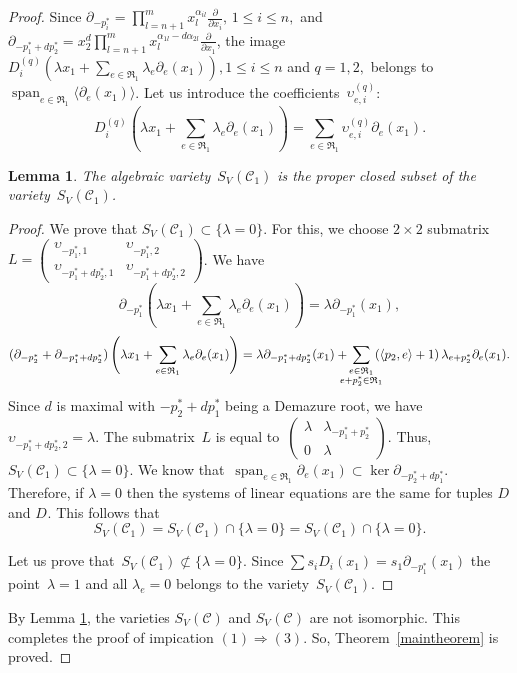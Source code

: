 \documentclass[a4paper,reqno,12pt]{amsart}
\DeclareMathOperator {\Ker}{ker}
\DeclareMathOperator {\spann}{span}
\DeclareMathOperator {\NNA}{(2)}
\DeclareMathOperator {\NA}{(1)}
\newtheorem{lmm}{Lemma}
\theoremstyle{definition}
\begin{document}
\begin{proof}
  Since $\partial_{-p_i^*}=\prod_{l=n+1}^mx_l^{\alpha_{il}}\frac{\partial}{\partial x_i},\, 1\leq i \leq n,$ and $\partial_{-p_1^*+dp_2^*}=x_2^d\prod_{l=n+1}^mx_l^{\alpha_{1l}-d\alpha_{2l}}\frac{\partial}{\partial x_1}$,
 the image $D_i^{(q)}(\lambda x_1+\sum_{e\in \mathfrak{R}_1}\lambda_e\partial_e(x_1)), 1\leq i \leq n$ and $q=1,2,$ belongs to $\spann_{e\in \mathfrak{R}_1}{\langle\partial_e(x_1)\rangle}$.
Let us introduce the coefficients~$\upsilon_{e,i}^{(q)}$:
  \[D_i^{(q)}\left(\lambda x_1+\sum_{e\in \mathfrak{R}_1}\lambda_e\partial_e(x_1)\right)=\sum_{e\in\mathfrak{R}_1}\upsilon_{e,i}^{(q)}\partial_e(x_1).\]
  \begin{lmm}\label{closed}
    The algebraic variety~$S_{V^{\NNA}}(\mathcal{C}_1)$ is the proper closed subset of the variety~$S_{V^{\NA}}(\mathcal{C}_1)$.
  \end{lmm}
  \begin{proof}
    We prove that $S_{V^{\NNA}}(\mathcal{C}_1)\subset\{\lambda=0\}$.
    For this, we choose ${2\times 2}$ submatrix~${L=\left(\begin{matrix}\upsilon^{\NNA}_{-p_1^*,1}&\upsilon^{\NNA}_{-p_1^*,2}\\\upsilon^{\NNA}_{-p_1^*+dp_2^*,1}&\upsilon^{\NNA}_{-p_1^*+dp_2^*,2}\end{matrix}\right)}$.
    We have
    \[\partial_{-p_1^*}(\lambda x_1 + \sum_{e\in \mathfrak{R}_1} \lambda_e \partial_e(x_1))=\lambda\partial_{-p_1^*}(x_1),\]
    \[(\partial_{-p_2^*}+\partial_{-p_1^*+dp_2^*})\left(\lambda x_1 + \sum_{e\in \mathfrak{R}_1} \lambda_e \partial_e(x_1)\right)=\lambda\partial_{-p_1^*+dp_2^*}(x_1)+\kern-0.8em\sum\limits_{\substack {e\in \mathfrak{R}_1\\ e+p_2^*\in \mathfrak{R}_1}}\kern-0.8em\left(\langle p_2, e \rangle+1\right)\lambda_{e+p_2^*}\partial_e(x_1).\]
    Since $d$ is maximal with $-p_2^*+dp_1^*$ being a Demazure root, we have $\upsilon^{\NNA}_{-p_1^*+dp_2^*,2}=\lambda$.
    The submatrix~$L$ is equal to~$\left(\begin{matrix}\lambda&\lambda_{-p_1^*+p_2^*}\\0&\lambda\end{matrix}\right)$.
    Thus, ${S_{V^{\NNA}}(\mathcal{C}_1)\subset\{\lambda=0\}}$.
    We know that~${\spann_{e\in\mathfrak{R}_1} {\partial_e(x_1)}\subset \Ker \partial_{-p_2^*+dp_1^*}}$.
    Therefore, if $\lambda=0$ then the systems of linear equations are the same for tuples $D^{\NA}$ and $D^{\NNA}$.
    This follows that \[S_{V^{\NNA}}(\mathcal{C}_1) = S_{V^{\NNA}}(\mathcal{C}_1)\cap \{\lambda=0\}= S_{V^{\NA}}(\mathcal{C}_1)\cap \{\lambda=0\}.\]


    Let us prove that~${S_{V^{\NA}}(\mathcal{C}_1)\not\subset \{\lambda=0\}}$.
    Since ${\sum s_i D_i^{\NA} (x_1)=s_1\partial_{-p_1^*}(x_1)}$ the point~${\lambda=1}$ and all ${\lambda_e=0}$ belongs to the variety~${S_{V^{\NA}}(\mathcal{C}_1)}$.
  \end{proof}

  By Lemma \ref{closed}, the varieties $S_{V^{\NA}}(\mathcal{C})$ and $S_{V^{\NNA}}(\mathcal{C})$ are not isomorphic.
  This completes the proof of impication $(1)\Rightarrow (3)$.
  So, Theorem~\ref{maintheorem} is proved.
  
\end{proof}
\end{document}
